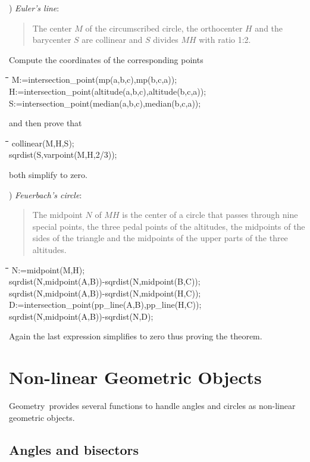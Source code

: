 \documentclass{article}
\newenvironment{code}{\tt \begin{tabbing}
\hspace*{1cm}\=\hspace*{1cm}\=\hspace*{1cm}\=
\hspace*{1cm}\=\hspace*{1cm}\=\kill
}{\end{tabbing}}
\newcommand{\geo}{{\sc Geometry}}
\begin{document}
) {\em Euler's line}: 
\begin{quote}
The center $M$ of the circumscribed circle, the orthocenter $H$ and
the barycenter $S$ are collinear and $S$ divides $MH$ with ratio 1:2.
\end{quote}
Compute the coordinates of the corresponding points
\begin{code}\+\>
M:=intersection\_point(mp(a,b,c),mp(b,c,a));\\
H:=intersection\_point(altitude(a,b,c),altitude(b,c,a));\\
S:=intersection\_point(median(a,b,c),median(b,c,a));
\end{code}
and then prove that
\begin{code}\+\>
		collinear(M,H,S);\\
                sqrdist(S,varpoint(M,H,2/3));
\end{code}
both simplify to zero.
\medskip

) {\em Feuerbach's circle}: 
\begin{quote}
The midpoint $N$ of $MH$ is the center of a circle that passes through
nine special points, the three pedal points of the altitudes, the
midpoints of the sides of the triangle and the midpoints of the upper
parts of the three altitudes.
\end{quote}
\begin{code}\+\>
         N:=midpoint(M,H);\\[8pt]

                sqrdist(N,midpoint(A,B))-sqrdist(N,midpoint(B,C));\\
                sqrdist(N,midpoint(A,B))-sqrdist(N,midpoint(H,C));\\[8pt]

         D:=intersection\_point(pp\_line(A,B),pp\_line(H,C));\\
                sqrdist(N,midpoint(A,B))-sqrdist(N,D);
\end{code}
Again the last expression simplifies to zero thus proving the theorem.

\section{Non-linear Geometric Objects}

\geo\ provides several functions to handle angles and circles as
non-linear geometric objects.

\subsection{Angles and bisectors}
\end{document}
